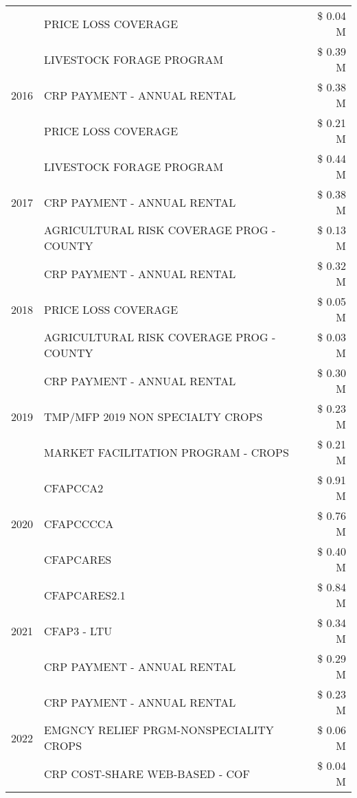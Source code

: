 \begin{tabular}{llr}
 & PRICE LOSS COVERAGE & \$ 0.04 M \\
\cline{1-3}
\multirow[t]{3}{*}{2016} & LIVESTOCK FORAGE PROGRAM & \$ 0.39 M \\
 & CRP PAYMENT - ANNUAL RENTAL & \$ 0.38 M \\
 & PRICE LOSS COVERAGE & \$ 0.21 M \\
\cline{1-3}
\multirow[t]{3}{*}{2017} & LIVESTOCK FORAGE PROGRAM & \$ 0.44 M \\
 & CRP PAYMENT - ANNUAL RENTAL & \$ 0.38 M \\
 & AGRICULTURAL RISK COVERAGE PROG - COUNTY & \$ 0.13 M \\
\cline{1-3}
\multirow[t]{3}{*}{2018} & CRP PAYMENT - ANNUAL RENTAL & \$ 0.32 M \\
 & PRICE LOSS COVERAGE & \$ 0.05 M \\
 & AGRICULTURAL RISK COVERAGE PROG - COUNTY & \$ 0.03 M \\
\cline{1-3}
\multirow[t]{3}{*}{2019} & CRP PAYMENT - ANNUAL RENTAL & \$ 0.30 M \\
 & TMP/MFP 2019 NON SPECIALTY CROPS & \$ 0.23 M \\
 & MARKET FACILITATION PROGRAM - CROPS & \$ 0.21 M \\
\cline{1-3}
\multirow[t]{3}{*}{2020} & CFAPCCA2 & \$ 0.91 M \\
 & CFAPCCCCA & \$ 0.76 M \\
 & CFAPCARES & \$ 0.40 M \\
\cline{1-3}
\multirow[t]{3}{*}{2021} & CFAPCARES2.1 & \$ 0.84 M \\
 & CFAP3 - LTU & \$ 0.34 M \\
 & CRP PAYMENT - ANNUAL RENTAL & \$ 0.29 M \\
\cline{1-3}
\multirow[t]{3}{*}{2022} & CRP PAYMENT - ANNUAL RENTAL & \$ 0.23 M \\
 & EMGNCY RELIEF PRGM-NONSPECIALITY CROPS & \$ 0.06 M \\
 & CRP COST-SHARE WEB-BASED - COF & \$ 0.04 M \\
\cline{1-3}
\bottomrule
\end{tabular}
